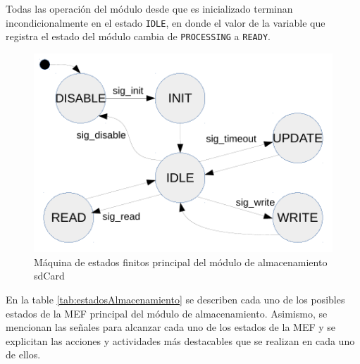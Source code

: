 Todas las operación del módulo desde que es inicializado terminan incondicionalmente en el estado \texttt{IDLE}, en donde el valor de la variable que registra el estado del módulo cambia de \texttt{PROCESSING} a \texttt{READY}.

\begin{figure}[htpb]
	\centering
	\includegraphics[width=\textwidth]{./Figures/MEF_sdCard.pdf}
	\caption[MEF principal del módulo de almacenamiento sdCard]{Máquina de estados finitos principal del módulo de almacenamiento sdCard}
	\label{fig:mef_sdcard}
\end{figure}

En la table \ref{tab:estadosAlmacenamiento} se describen cada uno de los posibles estados de la MEF principal del módulo de almacenamiento.  Asimismo, se mencionan las señales para alcanzar cada uno de los estados de la MEF y se explicitan las acciones y actividades más destacables que se realizan en cada uno de ellos.


